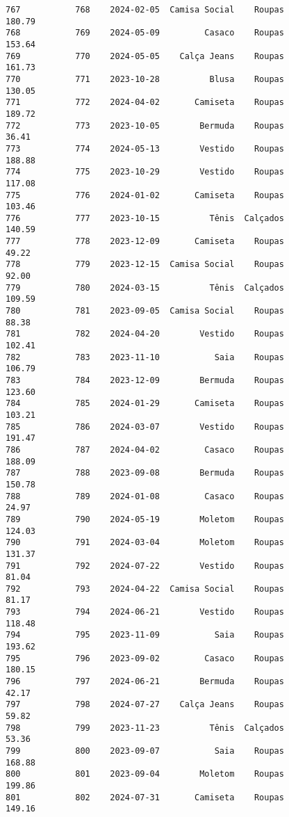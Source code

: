 \documentclass[11pt]{article}
\begin{document}
\begin{Verbatim}[commandchars=\\\{\}]
767           768    2024-02-05  Camisa Social    Roupas          180.79   
768           769    2024-05-09         Casaco    Roupas          153.64   
769           770    2024-05-05    Calça Jeans    Roupas          161.73   
770           771    2023-10-28          Blusa    Roupas          130.05   
771           772    2024-04-02       Camiseta    Roupas          189.72   
772           773    2023-10-05        Bermuda    Roupas           36.41   
773           774    2024-05-13        Vestido    Roupas          188.88   
774           775    2023-10-29        Vestido    Roupas          117.08   
775           776    2024-01-02       Camiseta    Roupas          103.46   
776           777    2023-10-15          Tênis  Calçados          140.59   
777           778    2023-12-09       Camiseta    Roupas           49.22   
778           779    2023-12-15  Camisa Social    Roupas           92.00   
779           780    2024-03-15          Tênis  Calçados          109.59   
780           781    2023-09-05  Camisa Social    Roupas           88.38   
781           782    2024-04-20        Vestido    Roupas          102.41   
782           783    2023-11-10           Saia    Roupas          106.79   
783           784    2023-12-09        Bermuda    Roupas          123.60   
784           785    2024-01-29       Camiseta    Roupas          103.21   
785           786    2024-03-07        Vestido    Roupas          191.47   
786           787    2024-04-02         Casaco    Roupas          188.09   
787           788    2023-09-08        Bermuda    Roupas          150.78   
788           789    2024-01-08         Casaco    Roupas           24.97   
789           790    2024-05-19        Moletom    Roupas          124.03   
790           791    2024-03-04        Moletom    Roupas          131.37   
791           792    2024-07-22        Vestido    Roupas           81.04   
792           793    2024-04-22  Camisa Social    Roupas           81.17   
793           794    2024-06-21        Vestido    Roupas          118.48   
794           795    2023-11-09           Saia    Roupas          193.62   
795           796    2023-09-02         Casaco    Roupas          180.15   
796           797    2024-06-21        Bermuda    Roupas           42.17   
797           798    2024-07-27    Calça Jeans    Roupas           59.82   
798           799    2023-11-23          Tênis  Calçados           53.36   
799           800    2023-09-07           Saia    Roupas          168.88   
800           801    2023-09-04        Moletom    Roupas          199.86   
801           802    2024-07-31       Camiseta    Roupas          149.16   

\end{Verbatim}
\end{document}
